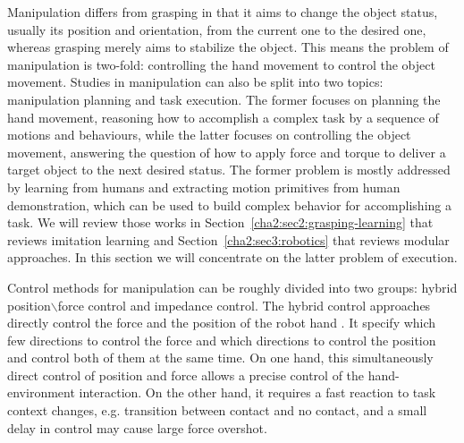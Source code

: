 Manipulation differs from grasping in that it aims to change the object status, usually its position and orientation, from the current one to the desired one, whereas grasping merely aims to stabilize the object.
This means the problem of manipulation is two-fold: controlling the hand movement to control the object movement.
Studies in manipulation can also be split into two topics: manipulation planning and task execution. The former focuses on planning the hand movement, reasoning how to accomplish a complex task by a sequence of motions and behaviours, while the latter focuses on controlling the object movement, answering the question of how to apply force and torque to deliver a target object to the next desired status. The former problem is mostly addressed by learning from humans and extracting motion primitives from human demonstration, which can be used to build complex behavior for accomplishing a task. We will review those works in Section~\ref{cha2:sec2:grasping-learning} that reviews imitation learning and Section~\ref{cha2:sec3:robotics} that reviews modular approaches. In this section we will concentrate on the latter problem of execution.



Control methods for manipulation can be roughly divided into two groups: hybrid position$\backslash$force control and impedance control. The hybrid control approaches directly control the force and the position of the robot hand \citep{li1989grasping,yoshikawa1993coordinated}. It specify which few directions to control the force and which directions to control the position and control both of them at the same time. On one hand, this simultaneously direct control of position and force allows a precise control of the hand-environment interaction. On the other hand, it requires a fast reaction to task context changes, e.g. transition between contact and no contact, and a small delay in control may cause large force overshot.


